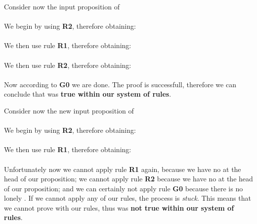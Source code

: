 Consider now the input proposition of \\
\dSmiley\dSmiley\Springtree\Candle\Candle\Springtree\dSmiley\dSmiley\Springtree\Coffeecup \\

We begin by using \textbf{R2}, therefore obtaining: \\
\Candle\Candle\Springtree\dSmiley\dSmiley\Springtree\Coffeecup \\

We then use rule \textbf{R1}, therefore obtaining: \\
\dSmiley\dSmiley\Springtree\Coffeecup \\

We then use rule \textbf{R2}, therefore obtaining: \\
\Coffeecup \\

Now according to \textbf{G0} we are done. The proof is successfull, therefore we can conclude that \dSmiley\dSmiley\Springtree\Candle\Candle\Springtree\dSmiley\dSmiley\Springtree\Coffeecup was \textbf{true within our system of rules}. 

Consider now the new input proposition of \\
\dSmiley\dSmiley\Springtree\dSmiley\dSmiley\Springtree\Candle\Springtree\Coffeecup \\

We begin by using \textbf{R2}, therefore obtaining: \\
\dSmiley\dSmiley\Springtree\Candle\Springtree\Coffeecup \\

We then use rule \textbf{R1}, therefore obtaining: \\
\Candle\Springtree\Coffeecup \\

Unfortunately now we cannot apply rule \textbf{R1} again, because we have no \dSmiley at the head of our proposition; we cannot apply rule \textbf{R2} because we have no \Candle at the head of our proposition; and we can certainly not apply rule \textbf{G0} because there is no lonely \Coffeecup. If we cannot apply any of our rules, the process is \textit{stuck}. This means that we cannot prove \dSmiley\dSmiley\Springtree\dSmiley\dSmiley\Springtree\Candle\Springtree\Coffeecup with our rules, thus \dSmiley\dSmiley\Springtree\dSmiley\dSmiley\Springtree\Candle\Springtree\Coffeecup was \textbf{not true within our system of rules}.
